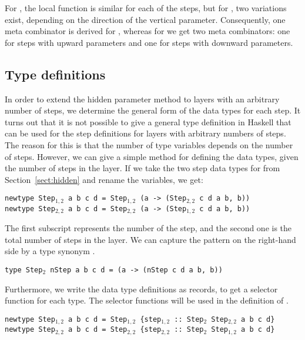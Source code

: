 \documentclass[preprint,natbib]{sigplanconf}
\begin{document}
\bc
 For , the local function is similar for each of the steps, but for , two variations exist, depending on the direction of the vertical parameter. Consequently, one meta combinator is derived for , whereas for  we get two meta combinators: one for steps with upward parameters and one for steps with downward parameters.
\ec
 
 
%																
\subsection{Type definitions} \label{subsecttypedef}

In order to extend the hidden parameter method to layers with an arbitrary number of steps, we determine the general form of the data types for each step. 
\bc
It turns out that it is not possible to give a general type definition in Haskell that can be used for the step definitions for layers with arbitrary numbers of steps. The reason for this is that the number of type variables depends on the number of steps. However, we can give a simple method for defining the data types, given the number of steps in the layer.
\ec
If we take the two step data types for  from Section~\ref{sect:hidden} and rename the variables, we get:

{\tt newtype Step$_{1,2}$ a b c d = Step$_{1,2}$ (a -> (Step$_{2,2}$ c d a b, b))}\\
{\tt newtype Step$_{2,2}$ a b c d = Step$_{2,2}$ (a -> (Step$_{1,2}$ c d a b, b))}

The first subscript represents the number of the step, and the second one is the total number of steps in the layer. We can capture the pattern on the right-hand side by a type synonym .

{\tt type Step$_2$ nStep a b c d = (a -> (nStep c d a b, b))}


Furthermore, we write the data type definitions as records, to get a selector function for each type. The selector functions will be used in the definition of .

{\tt newtype Step$_{1,2}$ a b c d = Step$_{1,2}$ \{step$_{1,2}$}\verb| :: |{\tt Step$_2$ Step$_{2,2}$  a b c d\}}\\
{\tt newtype Step$_{2,2}$ a b c d = Step$_{2,2}$ \{step$_{2,2}$}\verb| :: |{\tt Step$_2$ Step$_{1,2}$  a b c d\}}

\end{document}
